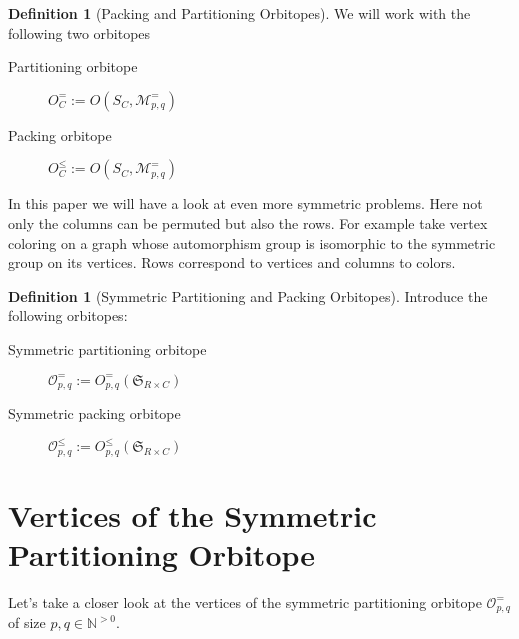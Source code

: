 \documentclass[a4paper]{amsart}
\theoremstyle{lemma}
\theoremstyle{definition}
\newtheorem{defn}[theorem]{Definition}
\theoremstyle{remark}
\newcommand\mpar[1]{\marginpar {\flushleft\sffamily\small #1}}
\newcommand{\todo}[1]{\mpar{#1}}
\newcommand{\lr}[1]{\ensuremath{\left( #1 \right)}}
\newcommand{\naturals}{\ensuremath{\mathbb{N}}}
\newcommand{\M}{\ensuremath{\mathcal{M}}}
\newcommand{\calO}{\ensuremath{\mathcal{O}}}
\newcommand{\Sym}{\ensuremath{\mathfrak{S}}}
\begin{document}


\begin{defn}[Packing and Partitioning Orbitopes]
  We will work with the following two orbitopes
  \begin{description}
    \item[Partitioning orbitope] \(O^=_C := O \lr{S_C, \M_{p,q}^=}\)
    \item[Packing orbitope] \(O^{\leq}_C := O \lr{S_C, \M_{p,q}^=}\)
   \end{description}
\end{defn}

In this paper we will have a look at even more symmetric problems.
Here not only the columns can be permuted but also the rows.  For
example take vertex coloring on a graph whose automorphism group is
isomorphic to the symmetric group on its vertices.  Rows correspond to
vertices and columns to colors.

\begin{defn}[Symmetric Partitioning and Packing Orbitopes]
Introduce the following orbitopes:
\begin{description}
\item[Symmetric partitioning orbitope] \(\mathcal{O}^=_{p,q} := O^=_{p, q} \lr{\Sym_{R \times C}} \)
\item[Symmetric packing orbitope] \(\mathcal{O}^\leq_{p,q} := O^\leq_{p, q} \lr{\Sym_{R \times C}} \)
\end{description}
\end{defn}




\section{Vertices of the Symmetric Partitioning Orbitope}
Let's take a closer look at the
vertices of the symmetric partitioning orbitope \(\calO^=_{p, q}\) of size
\(p, q \in \naturals^{>0}\).
\end{document}
